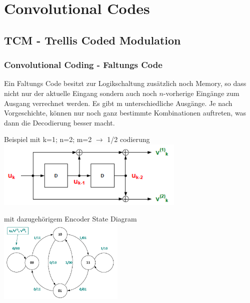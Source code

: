 \section{Convolutional Codes}
\subsection{TCM - Trellis Coded Modulation}
\subsubsection{Convolutional Coding - Faltungs Code}
Ein Faltungs Code besitzt zur Logikschaltung zus\"atzlich noch Memory, so dass
nicht nur der aktuelle Eingang sondern auch noch $n$-vorherige Eing\"ange zum
Ausgang verrechnet werden. Es gibt m unterschiedliche Ausg\"ange. 
Je nach Vorgeschichte, k\"onnen nur noch ganz bestimmte Kombinationen auftreten,
was dann die Decodierung besser macht.\\
\begin{minipage}{9cm}
	Beispiel mit k=1; n=2; m=2 $\to$ 1/2 codierung\\
	\includegraphics[width=9cm]{./bilder/covolutionSchemata.png}
\end{minipage}
\hspace{5mm}
\begin{minipage}{8cm}
\vspace{4mm}
	mit dazugeh\"origem Encoder State Diagram\\
\hspace{5mm}
	\includegraphics[width=6cm]{./bilder/covolutionStateDiagram.png}
\end{minipage}

